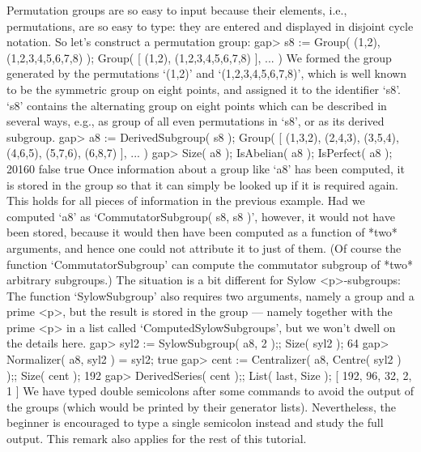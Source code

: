 Permutation  groups  are so easy to  input  because their elements, i.e.,
permutations,  are  so easy to  type: they  are  entered and displayed in
disjoint cycle notation. So let's construct a permutation group:
\beginexample
    gap> s8 := Group( (1,2), (1,2,3,4,5,6,7,8) );
    Group( [ (1,2), (1,2,3,4,5,6,7,8) ], ... )
\endexample
We  formed  the  group     generated by  the permutations    `(1,2)'  and
`(1,2,3,4,5,6,7,8)', which  is well known   to be the symmetric  group on
eight  points, and assigned it to  the identifier `s8'. `s8' contains the
alternating group on eight points which can be described in several ways,
e.g.,  as group  of all  even permutations  in  `s8',  or as its  derived
subgroup.
\beginexample
    gap> a8 := DerivedSubgroup( s8 );
    Group( [ (1,3,2), (2,4,3), (3,5,4), (4,6,5), (5,7,6), (6,8,7) ], ... )
    gap> Size( a8 ); IsAbelian( a8 ); IsPerfect( a8 );
    20160
    false
    true
\endexample
Once information about a group like `a8' has  been computed, it is stored
in the group so that it can simply be looked up  if it is required again.
This holds for all pieces of information  in the previous example. Had we
computed `a8'  as `CommutatorSubgroup( s8, s8  )',  however, it would not
have been stored, because it would then  have been computed as a function
of *two* arguments, and hence one could not attribute it to just of them.
(Of course  the function `CommutatorSubgroup'  can compute the commutator
subgroup of *two* arbitrary subgroups.)  The situation is a bit different
for Sylow <p>-subgroups:  The function `SylowSubgroup' also  requires two
arguments, namely  a group and  a prime <p>, but the  result is stored in
the  group  --- namely  together with  the   prime <p> in a  list  called
`ComputedSylowSubgroups', but we won't dwell on the details here.
\beginexample
    gap> syl2 := SylowSubgroup( a8, 2 );; Size( syl2 );
    64
    gap> Normalizer( a8, syl2 ) = syl2;
    true
    gap> cent := Centralizer( a8, Centre( syl2 ) );; Size( cent );
    192
    gap> DerivedSeries( cent );; List( last, Size );
    [ 192, 96, 32, 2, 1 ]
\endexample
We have typed double semicolons  after some commands  to avoid the output
of the  groups   (which would  be  printed  by their  generator   lists).
Nevertheless, the beginner  is  encouraged to   type  a single  semicolon
instead and study the full output. This  remark also applies for the rest
of this tutorial.

